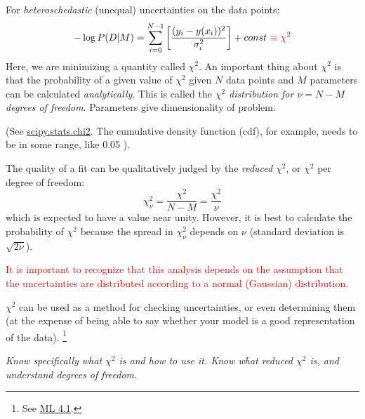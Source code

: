 \documentclass{article}
\newcommand{\test}[1]{%
    \begin{center}
        \colorbox{hl}{\parbox{0.9\textwidth}{\emph{\centering #1}}}
    \end{center}}
\newcommand{\mynotes}[1]{%
    \textcolor{myGreen}{\fontfamily{phv}\selectfont #1}
    }
\begin{document}
For \textit{heteroschedastic} (unequal) uncertainties on the data points:
\[
    -\log P(D|M) = \sum_{i=0}^{N-1}{
        \left[ \frac{(y_{i}-y(x_{i}))^{2}}{\sigma_{i}^{2}} \right] }
    + const\ \textcolor{red}{\equiv \chi^{2}}
    \]
Here, we are minimizing a quantity called
$\chi^{2}$. An important thing about $\chi^{2}$ is that the probability
of a given value of $\chi^{2}$ given $N$ data points and $M$ parameters
can be calculated \textit{analytically}. This is called the
\textit{$\chi^{2}$ distribution for $\nu = N-M$ degrees of freedom}.
\mynotes{Parameters give dimensionality of problem.}
(See
\href{http://docs.scipy.org/doc/scipy-0.15.1/reference/generated/scipy.stats.chi2.html}
{scipy.stats.chi2}. The cumulative density function (cdf), for example,
needs to be in some range, like 0.05 ).

The quality of a fit can be qualitatively judged by the
\textit{reduced} $\chi^{2}$, or $\chi^{2}$ per degree of freedom:
\[
    \chi_{\nu}^{2} = \frac{\chi^{2}}{N-M} = \frac{\chi^{2}}{\nu}
    \]
which is expected to have a value near unity. However, it is best to calculate
the probability of $\chi^{2}$ because the spread in $\chi_{\nu}^{2}$ depends
on $\nu$ (standard deviation is $\sqrt{2\nu}$).

\textcolor{red}{It is important to recognize that this analysis depends
on the assumption that the uncertainties are distributed according to
a normal (Gaussian) distribution.}

$\chi^{2}$ can be used as a method for checking uncertainties, or even
determining them (at the expense of being able to say whether your
model is a good representation of the data).
\footnote{
    See \href{http://astronomy.nmsu.edu/holtz/a575/images/ML4.1.png}{ML 4.1}.
}

\test{Know specifically what $\chi^{2}$ is and how to use it.  Know what reduced
$\chi^{2}$ is, and understand degrees of freedom.}
\end{document}
